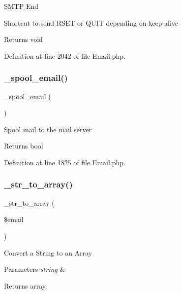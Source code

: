 S\+M\+TP End

Shortcut to send R\+S\+ET or Q\+U\+IT depending on keep-\/alive

\begin{DoxyReturn}{Returns}
void 
\end{DoxyReturn}


Definition at line 2042 of file Email.\+php.

\mbox{\label{class_c_i___email_a5d45a2f98c27332dfe78086c88eafd3c}} 
\subsubsection{\texorpdfstring{\_spool\_email()}{\_spool\_email()}}
{\footnotesize\ttfamily \+\_\+spool\+\_\+email (\begin{DoxyParamCaption}{ }\end{DoxyParamCaption})\hspace{0.3cm}{\ttfamily [protected]}}

Spool mail to the mail server

\begin{DoxyReturn}{Returns}
bool 
\end{DoxyReturn}


Definition at line 1825 of file Email.\+php.

\mbox{\label{class_c_i___email_a64cd83e470ede0781d028d7198474d1c}} 
\subsubsection{\texorpdfstring{\_str\_to\_array()}{\_str\_to\_array()}}
{\footnotesize\ttfamily \+\_\+str\+\_\+to\+\_\+array (\begin{DoxyParamCaption}\item[{}]{\$email }\end{DoxyParamCaption})\hspace{0.3cm}{\ttfamily [protected]}}

Convert a String to an Array


\begin{DoxyParams}{Parameters}
{\em string} & \\
\hline
\end{DoxyParams}
\begin{DoxyReturn}{Returns}
array 
\end{DoxyReturn}


